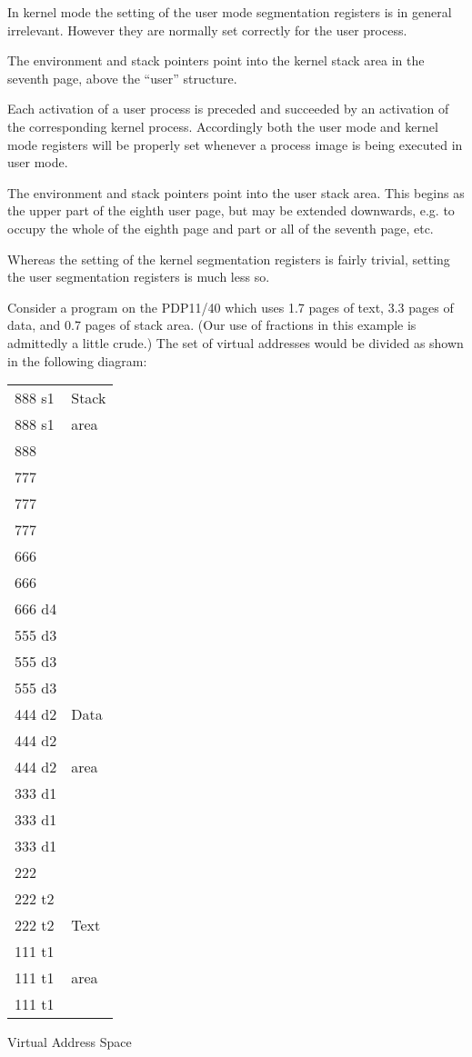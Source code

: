 In kernel mode the setting of the user
mode segmentation registers is in general
irrelevant. However they are normally
set correctly for the user process.

The environment and stack pointers
point into the kernel stack area in the
seventh page, above the ``user'' structure.


Each activation of a user process is
preceded and succeeded by an activation
of the corresponding kernel process.
Accordingly both the user mode and kernel mode registers will be properly set
whenever a process image is being executed in user mode.

The environment and stack pointers
point into the user stack area. This
begins as the upper part of the eighth
user page, but may be extended downwards, e.g. to occupy the whole of
the eighth page and part or all of the
seventh page, etc.

Whereas the setting of the kernel segmentation registers is fairly trivial,
setting the user segmentation registers
is much less so.



Consider a program on the PDP11/40
which uses 1.7 pages of text, 3.3 pages
of data, and 0.7 pages of stack area.
(Our use of fractions in this example
is admittedly a little crude.) The set
of virtual addresses would be divided
as shown in the following diagram:

\begin{center}
\begin{tabular}{|l|l} \cline{1-1}
888  s1 & Stack \\
888  s1 & area \\
\cline{1-1}
888     & \\
\cline{1-1}
777     & \\
777     & \\
777     & \\
\cline{1-1}
666     & \\
666     & \\
\cline{1-1}
666  d4 & \\
\cline{1-1}
555  d3 & \\
555  d3 & \\
555  d3 & \\
\cline{1-1}
444  d2 & Data \\
444  d2 & \\
444  d2 & area \\
\cline{1-1}
333  d1 & \\
333  d1 & \\
333  d1 & \\
\cline{1-1}
222     & \\
\cline{1-1}
222  t2 & \\
222  t2 & Text \\
\cline{1-1}
111  t1 & \\
111  t1 & area \\
111  t1 & \\
\cline{1-1}
\end{tabular}

\medskip

Virtual Address Space
\end{center}


